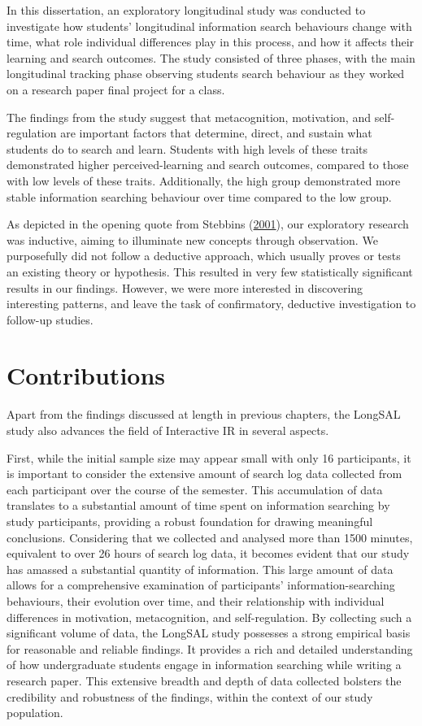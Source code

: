 \documentclass[letterpaper, nobind]{templates/ociamthesis}
\begin{document}
In this dissertation, an exploratory longitudinal study was conducted to investigate how students' longitudinal information search behaviours change with time, what role individual differences play in this process, and how it affects their learning and search outcomes.
The study consisted of three phases, with the main longitudinal tracking phase observing students search behaviour as they worked on a research paper final project for a class.

The findings from the study suggest that metacognition, motivation, and self-regulation are important factors that determine, direct, and sustain what students do to search and learn.
Students with high levels of these traits demonstrated higher perceived-learning and search outcomes, compared to those with low levels of these traits.
Additionally, the high group demonstrated more stable information searching behaviour over time compared to the low group.

As depicted in the opening quote from Stebbins (\protect\hyperlink{ref-stebbins2001exploratory}{2001}), our exploratory research was inductive, aiming to illuminate new concepts through observation.
We purposefully did not follow a deductive approach, which usually proves or tests an existing theory or hypothesis.
This resulted in very few statistically significant results in our findings.
However, we were more interested in discovering interesting patterns, and leave the task of confirmatory, deductive investigation to follow-up studies.

\hypertarget{contributions}{%
\section{Contributions}\label{contributions}}

Apart from the findings discussed at length in previous chapters, the LongSAL study also advances the field of Interactive IR in several aspects.

First, while the initial sample size may appear small with only 16 participants, it is important to consider the extensive amount of search log data collected from each participant over the course of the semester. This accumulation of data translates to a substantial amount of time spent on information searching by study participants, providing a robust foundation for drawing meaningful conclusions.
Considering that we collected and analysed more than 1500 minutes, equivalent to over 26 hours of search log data, it becomes evident that our study has amassed a substantial quantity of information. This large amount of data allows for a comprehensive examination of participants' information-searching behaviours, their evolution over time, and their relationship with individual differences in motivation, metacognition, and self-regulation.
By collecting such a significant volume of data, the LongSAL study possesses a strong empirical basis for reasonable and reliable findings. It provides a rich and detailed understanding of how undergraduate students engage in information searching while writing a research paper. This extensive breadth and depth of data collected bolsters the credibility and robustness of the findings, within the context of our study population.
\end{document}
